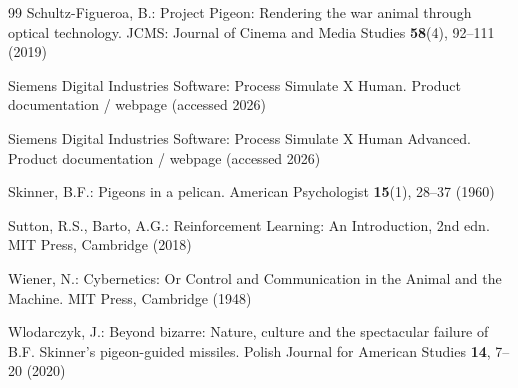 \documentclass[runningheads]{llncs}
\begin{document}
\begin{thebibliography}{99}
Schultz-Figueroa, B.: Project Pigeon: Rendering the war animal through optical technology. JCMS: Journal of Cinema and Media Studies \textbf{58}(4), 92--111 (2019)

Siemens Digital Industries Software: Process Simulate X Human. Product documentation / webpage (accessed 2026)

Siemens Digital Industries Software: Process Simulate X Human Advanced. Product documentation / webpage (accessed 2026)

Skinner, B.F.: Pigeons in a pelican. American Psychologist \textbf{15}(1), 28--37 (1960)

Sutton, R.S., Barto, A.G.: Reinforcement Learning: An Introduction, 2nd edn. MIT Press, Cambridge (2018)

Wiener, N.: Cybernetics: Or Control and Communication in the Animal and the Machine. MIT Press, Cambridge (1948)

Wlodarczyk, J.: Beyond bizarre: Nature, culture and the spectacular failure of B.F. Skinner's pigeon-guided missiles. Polish Journal for American Studies \textbf{14}, 7--20 (2020)

\end{thebibliography}
\end{document}

